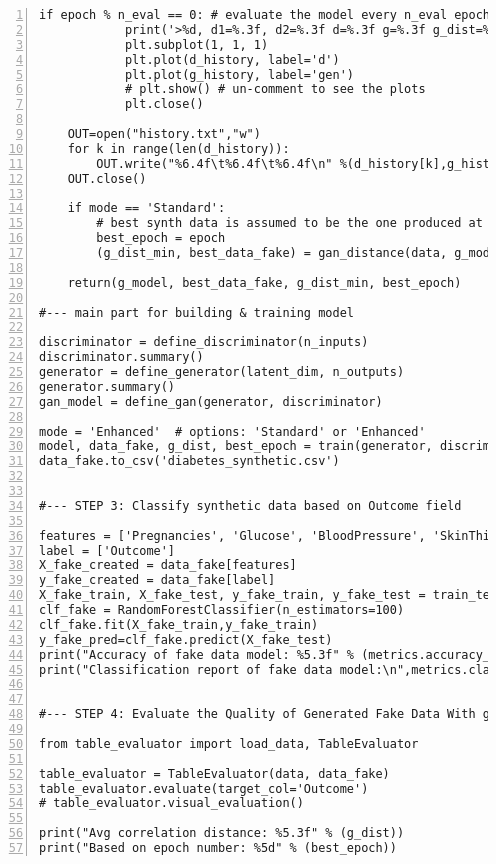 \documentclass[oneside,10pt]{book}
\begin{document}
\begin{lstlisting}[numbers=left]
        if epoch % n_eval == 0: # evaluate the model every n_eval epochs
            print('>%d, d1=%.3f, d2=%.3f d=%.3f g=%.3f g_dist=%.3f' % (epoch, d_loss_real, d_loss_fake, d_loss,  g_loss_fake, g_dist))       
            plt.subplot(1, 1, 1)
            plt.plot(d_history, label='d')
            plt.plot(g_history, label='gen')
            # plt.show() # un-comment to see the plots
            plt.close()
       
    OUT=open("history.txt","w")
    for k in range(len(d_history)):
        OUT.write("%6.4f\t%6.4f\t%6.4f\n" %(d_history[k],g_history[k],g_dist_history[k]))
    OUT.close()
    
    if mode == 'Standard':
        # best synth data is assumed to be the one produced at last epoch
        best_epoch = epoch
        (g_dist_min, best_data_fake) = gan_distance(data, g_model, latent_dim, nobs_synth=400)
       
    return(g_model, best_data_fake, g_dist_min, best_epoch) 

#--- main part for building & training model

discriminator = define_discriminator(n_inputs)
discriminator.summary()
generator = define_generator(latent_dim, n_outputs)
generator.summary()
gan_model = define_gan(generator, discriminator)

mode = 'Enhanced'  # options: 'Standard' or 'Enhanced'
model, data_fake, g_dist, best_epoch = train(generator, discriminator, gan_model, latent_dim, mode)
data_fake.to_csv('diabetes_synthetic.csv') 
    

#--- STEP 3: Classify synthetic data based on Outcome field

features = ['Pregnancies', 'Glucose', 'BloodPressure', 'SkinThickness', 'Insulin', 'BMI', 'DiabetesPedigreeFunction', 'Age']
label = ['Outcome']
X_fake_created = data_fake[features]
y_fake_created = data_fake[label]
X_fake_train, X_fake_test, y_fake_train, y_fake_test = train_test_split(X_fake_created, y_fake_created, test_size=0.30, random_state=42)
clf_fake = RandomForestClassifier(n_estimators=100)
clf_fake.fit(X_fake_train,y_fake_train)
y_fake_pred=clf_fake.predict(X_fake_test)
print("Accuracy of fake data model: %5.3f" % (metrics.accuracy_score(y_fake_test, y_fake_pred)))
print("Classification report of fake data model:\n",metrics.classification_report(y_fake_test, y_fake_pred))


#--- STEP 4: Evaluate the Quality of Generated Fake Data With g_dist and Table_evaluator

from table_evaluator import load_data, TableEvaluator

table_evaluator = TableEvaluator(data, data_fake)
table_evaluator.evaluate(target_col='Outcome')
# table_evaluator.visual_evaluation() 

print("Avg correlation distance: %5.3f" % (g_dist))
print("Based on epoch number: %5d" % (best_epoch))
\end{lstlisting}
\end{document}
